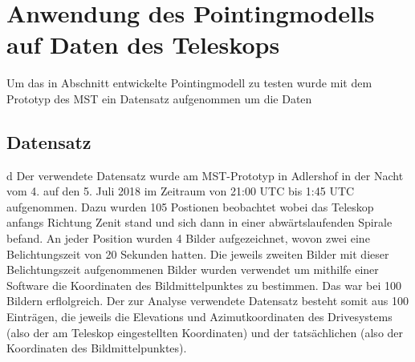 \chapter{Anwendung des Pointingmodells auf Daten des Teleskops}
Um das in Abschnitt entwickelte Pointingmodell zu testen wurde mit dem Prototyp des MST ein Datensatz aufgenommen um die Daten
\section{Datensatz}d
Der verwendete Datensatz wurde am MST-Prototyp in Adlershof in der Nacht vom 4. auf den 5. Juli 2018 im Zeitraum von 21:00 UTC bis 1:45 UTC aufgenommen. Dazu wurden 105 Postionen beobachtet wobei das Teleskop anfangs Richtung Zenit stand und sich dann in einer abwärtslaufenden Spirale befand. An jeder Position wurden 4 Bilder aufgezeichnet, wovon zwei eine Belichtungszeit von 20 Sekunden hatten. Die jeweils zweiten Bilder mit dieser Belichtungszeit aufgenommenen Bilder wurden verwendet um mithilfe einer Software die Koordinaten des Bildmittelpunktes zu bestimmen. Das war bei 100 Bildern erflolgreich. Der zur Analyse verwendete Datensatz besteht somit aus 100 Einträgen, die jeweils die Elevations und Azimutkoordinaten des Drivesystems (also der am Teleskop eingestellten Koordinaten) und der tatsächlichen (also der Koordinaten des Bildmittelpunktes).

